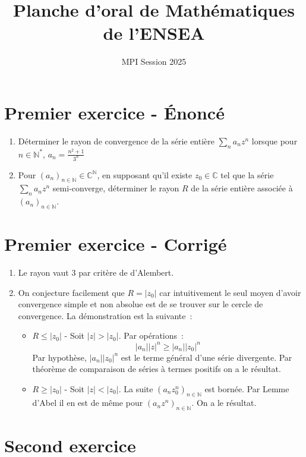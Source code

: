 \documentclass[11pt]{article}
\title{Planche d'oral de Mathématiques de l’ENSEA}
\author{MPI Session 2025}
\date{}
\newcommand{\N}{\mathbb{N}}
\newcommand{\C}{\mathbb{C}}
\newcommand{\abs}[1]{\vert #1 \vert}
\begin{document}
\maketitle

\section*{Premier exercice - Énoncé}
\begin{enumerate}[label=\textbf{\arabic*.}]
    \item Déterminer le rayon de convergence de la série entière $\sum_n a_n z^n$ lorsque pour $n \in \N^*$, $\displaystyle a_n = \frac{n^2+1}{3^n}$
    \item Pour $(a_n)_{n \in \N} \in \C^\N$, en supposant qu'il existe $z_0 \in \C$ tel que la série $\sum_n a_n z^n$ semi-converge, déterminer le rayon $R$ de la série entière associée à $(a_n)_{n \in \N}$.
\end{enumerate}

\section*{Premier exercice - Corrigé}
\begin{enumerate}[label=\textbf{\arabic*.}]
    \item Le rayon vaut $3$ par critère de d'Alembert.
    \item On conjecture facilement que $R = \abs{z_0}$ car intuitivement le seul moyen d'avoir convergence simple et non absolue est de se trouver sur le cercle de convergence. La démonstration est la suivante~:
    \begin{itemize}
        \item $\boxed{R \leq \abs{z_0}}$ - Soit $\abs{z} > \abs{z_0}$. Par opérations~:
        $$\abs{a_n}\abs{z}^n \geq \abs{a_n}\abs{z_0}^n$$
        Par hypothèse, $\abs{a_n}\abs{z_0}^n$ est le terme général d'une série divergente. Par théorème de comparaison de séries à termes positifs on a le résultat.
        \item $\boxed{R \geq \abs{z_0}}$ - Soit $\abs{z} < \abs{z_0}$. La suite $(a_n z_0^n)_{n \in \N}$ est bornée. Par Lemme d'Abel il en est de même pour $(a_n z^n)_{n \in \N}$. On a le résultat.
    \end{itemize}
\end{enumerate}

\section*{Second exercice}
\end{document}
